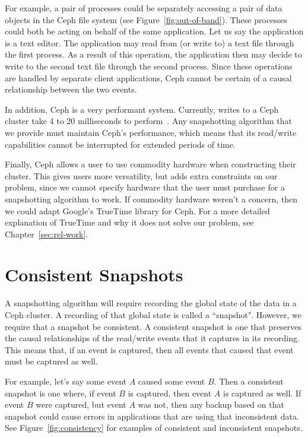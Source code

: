 For example, a pair of processes could be separately accessing a pair of
data objects in the Ceph file system (see
Figure~\ref{fig:out-of-band}). These processes could both be acting on
behalf of the same application. Let us say the application is a text
editor. The application may read from (or write to) a text file
through the first process.  As a result of this operation, the
application then may decide to write to the second text file through
the second process. Since these operations are handled by separate
client applications, Ceph cannot be certain of a causal relationship between the
two events.

In addition, Ceph is a very performant system. Currently, writes to a
Ceph cluster take 4 to 20 milliseconds to perform~\citep{Sage}. Any
snapshotting algorithm that we provide must maintain Ceph's performance, which means
that its read/write capabilities cannot be interrupted for extended
periods of time.

Finally, Ceph allows a user to use commodity hardware when
constructing their cluster. This gives users more versatility, but
adds extra constraints on our problem, since we cannot specify
hardware that the user must purchase for a snapshotting algorithm to work. If commodity 
hardware weren't a concern, then we could adapt Google's TrueTime library for 
Ceph. For a more detailed explanation of TrueTime
and why it does not solve our problem, see Chapter~\ref{sec:rel-work}.

\section{Consistent Snapshots}

A snapshotting algorithm will require recording the global state of
the data in a Ceph cluster. A recording of that global state is called
a ``snapshot". However, we require that a snapshot be consistent.  A
consistent snapshot is one that preserves the causal relationships of
the read/write events that it captures in its recording. This means that, if an event
is captured, then all events that caused that event must be captured
as well.

For example, let's say some event $A$ caused some event $B$.  Then a
consistent snapshot is one where, if event $B$ is captured, then event
$A$ is captured as well. If event $B$ were captured, but event $A$ was
not, then any backup based on that snapshot could cause errors in
applications that are using that inconsistent data. See
Figure~\ref{fig:consistency} for examples of consistent and
inconsistent snapshots.

